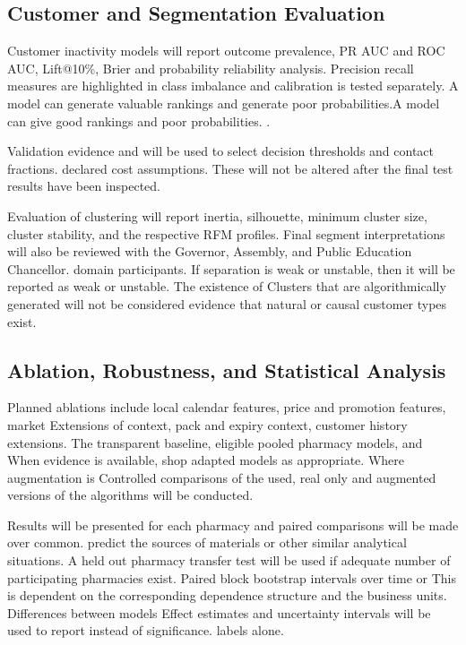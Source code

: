 \documentclass[a4paper,11pt,oneside]{book}
\theoremstyle{plain}
\theoremstyle{definition}
\theoremstyle{remark}
\begin{document}
\subsection{Customer and Segmentation Evaluation}
\label{subsec:customer_segmentation_evaluation}

Customer inactivity models will report outcome prevalence, PR AUC and ROC AUC, Lift@10\%, Brier and probability reliability analysis. Precision recall measures are highlighted in class imbalance \cite{saito2015pr} and calibration is tested separately. A model can generate valuable rankings and generate poor probabilities.A model can give good rankings and poor probabilities. \cite{niculescu2005calibration}.

Validation evidence and will be used to select decision thresholds and contact fractions. declared cost assumptions. These will not be altered after the final test results have been inspected.

Evaluation of clustering will report inertia, silhouette, minimum cluster size, cluster stability, and the respective RFM profiles. Final segment interpretations will also be reviewed with the Governor, Assembly, and Public Education Chancellor. domain participants. If separation is weak or unstable, then it will be reported as weak or unstable. The existence of Clusters that are algorithmically generated will not be considered evidence that natural or causal customer types exist.

\subsection{Ablation, Robustness, and Statistical Analysis}
\label{subsec:ablation_robustness}

Planned ablations include local calendar features, price and promotion features, market Extensions of context, pack and expiry context, customer history extensions. The transparent baseline, eligible pooled pharmacy models, and When evidence is available, shop adapted models as appropriate. Where augmentation is Controlled comparisons of the used, real only and augmented versions of the algorithms will be conducted.

Results will be presented for each pharmacy and paired comparisons will be made over common. predict the sources of materials or other similar analytical situations. A held out pharmacy transfer test will be used if adequate number of participating pharmacies exist. Paired block bootstrap intervals over time or This is dependent on the corresponding dependence structure and the business units. Differences between models Effect estimates and uncertainty intervals will be used to report instead of significance. labels alone.
\end{document}

